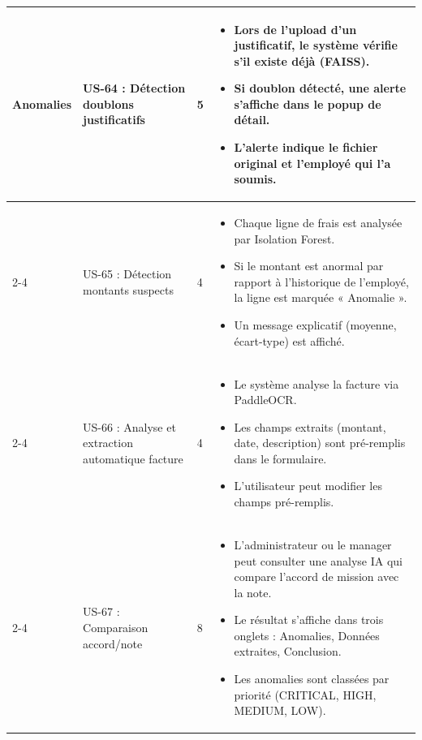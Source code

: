 \documentclass[12pt,a4paper]{report}
\begin{document}
\begin{longtable}{|p{2.5cm}|p{3cm}|p{1.5cm}|p{8cm}|}
\multirow{4}{*}{Anomalies} & US-64 : Détection doublons justificatifs & 5 & \begin{itemize}
 \item Lors de l’upload d’un justificatif, le système vérifie s’il existe déjà (FAISS).
 \item Si doublon détecté, une alerte s’affiche dans le popup de détail.
 \item L’alerte indique le fichier original et l’employé qui l’a soumis.
\end{itemize} \\
\cline{2-4}
& US-65 : Détection montants suspects & 4 & \begin{itemize}
 \item Chaque ligne de frais est analysée par Isolation Forest.
 \item Si le montant est anormal par rapport à l’historique de l’employé, la ligne est marquée « Anomalie ».
 \item Un message explicatif (moyenne, écart-type) est affiché.
\end{itemize} \\
\cline{2-4}
& US-66 : Analyse et extraction automatique facture & 4 & \begin{itemize}
 \item Le système analyse la facture via PaddleOCR.
 \item Les champs extraits (montant, date, description) sont pré-remplis dans le formulaire.
 \item L’utilisateur peut modifier les champs pré-remplis.
\end{itemize} \\
\cline{2-4}
& US-67 : Comparaison accord/note & 8 & \begin{itemize}
 \item L’administrateur ou le manager peut consulter une analyse IA qui compare l’accord de mission avec la note.
 \item Le résultat s’affiche dans trois onglets : Anomalies, Données extraites, Conclusion.
 \item Les anomalies sont classées par priorité (CRITICAL, HIGH, MEDIUM, LOW).
\end{itemize} \\
\hline


\end{longtable}
\end{document}
